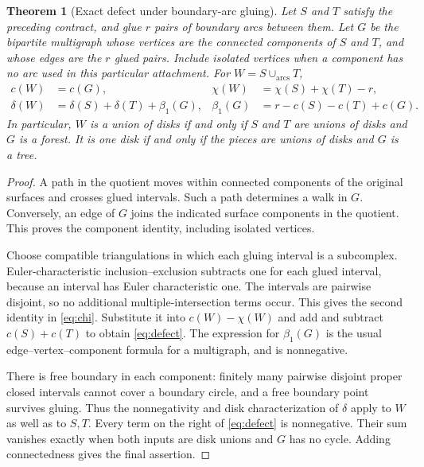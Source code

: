 \documentclass[11pt,a4paper]{article}
\newtheorem{theorem}{Theorem}[section]
\theoremstyle{definition}
\theoremstyle{remark}
\begin{document}
\begin{theorem}[Exact defect under boundary-arc gluing]\label{thm:defect}
Let $S$ and $T$ satisfy the preceding contract, and glue $r$ pairs of boundary arcs
between them. Let $G$ be the bipartite multigraph whose vertices are the connected
components of $S$ and $T$, and whose edges are the $r$ glued pairs. Include isolated
vertices when a component has no arc used in this particular attachment. For
$W=S\cup_{\mathrm{arcs}}T$,
\begin{align}
 c(W)&=c(G), & \chi(W)&=\chi(S)+\chi(T)-r,\label{eq:chi}\\
 \delta(W)&=\delta(S)+\delta(T)+\beta_1(G), &
 \beta_1(G)&=r-c(S)-c(T)+c(G).\label{eq:defect}
\end{align}
In particular, $W$ is a union of disks if and only if $S$ and $T$ are unions of disks
and $G$ is a forest. It is one disk if and only if the pieces are unions of disks and
$G$ is a tree.
\end{theorem}
\begin{proof}
A path in the quotient moves within connected components of the original surfaces and
crosses glued intervals. Such a path determines a walk in $G$. Conversely, an edge of
$G$ joins the indicated surface components in the quotient. This proves the component
identity, including isolated vertices.

Choose compatible triangulations in which each gluing interval is a subcomplex.
Euler-characteristic inclusion--exclusion subtracts one for each glued interval,
because an interval has Euler characteristic one. The intervals are pairwise disjoint,
so no additional multiple-intersection terms occur. This gives the second identity in
\eqref{eq:chi}. Substitute it into $c(W)-\chi(W)$ and add and subtract
$c(S)+c(T)$ to obtain \eqref{eq:defect}. The expression for $\beta_1(G)$ is the
usual edge--vertex--component formula for a multigraph, and is nonnegative.

There is free boundary in each component: finitely many pairwise disjoint proper closed
intervals cannot cover a boundary circle, and a free boundary point survives gluing.
Thus the nonnegativity and disk characterization of $\delta$ apply to $W$ as well as
to $S,T$. Every term on the right of \eqref{eq:defect} is nonnegative. Their sum
vanishes exactly when both inputs are disk unions and $G$ has no cycle. Adding
connectedness gives the final assertion.
\end{proof}
\end{document}
